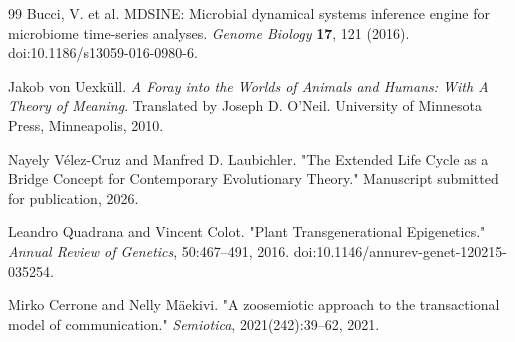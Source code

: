 \documentclass[pdflatex,sn-mathphys-num]{sn-jnl}
\theoremstyle{thmstylethree}
\theoremstyle{thmstyleone}
\begin{document}
\begin{thebibliography}{99}
Bucci, V. et al.
MDSINE: Microbial dynamical systems inference engine for microbiome time-series analyses.
\textit{Genome Biology} \textbf{17}, 121 (2016).
doi:10.1186/s13059-016-0980-6.

Jakob von Uexk{\"u}ll.
\textit{A Foray into the Worlds of Animals and Humans: With A Theory of Meaning}.
Translated by Joseph D. O'Neil.
University of Minnesota Press, Minneapolis, 2010.

Nayely Vélez-Cruz and Manfred D. Laubichler.
"The Extended Life Cycle as a Bridge Concept for Contemporary Evolutionary Theory."
Manuscript submitted for publication, 2026.

Leandro Quadrana and Vincent Colot.
"Plant Transgenerational Epigenetics."
\textit{Annual Review of Genetics}, 50:467--491, 2016.
doi:10.1146/annurev-genet-120215-035254.

Mirko Cerrone and Nelly M{\"a}ekivi.
"A zoosemiotic approach to the transactional model of communication."
\textit{Semiotica}, 2021(242):39--62, 2021.
\end{thebibliography}
\end{document}
